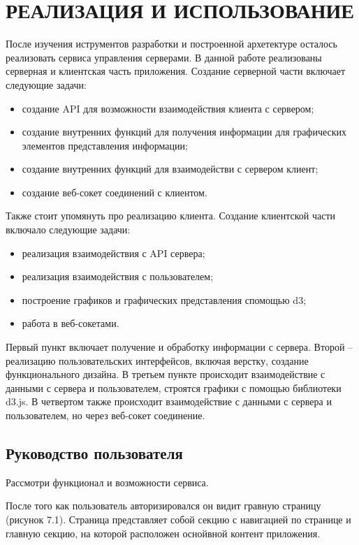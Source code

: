 \section{РЕАЛИЗАЦИЯ И ИСПОЛЬЗОВАНИЕ}
\label{sec:manual}

После изучения иструментов разработки и построенной архетектуре осталось реализовать сервиса управления серверами.
В данной работе реализованы серверная и клиентская часть приложения. Создание серверной части включает следующие
задачи:
\begin{itemize}
  \item создание API для возможности взаимодействия клиента с сервером;
  \item создание внутренних функций для получения информации для графических элементов представления информации;
  \item создание внутренних функций для взаимодействи с сервером клиент;
  \item создание веб-сокет соединений с клиентом.
\end{itemize}


Также стоит упомянуть про реализацию клиента. Создание клиентской части включало следующие задачи:
\begin{itemize}
\item реализация взаимодействия с API сервера;
\item реализация взаимодействия с пользователем;
\item построение графиков и графических представления спомощью d3;
\item работа в веб-сокетами.
\end{itemize}

Первый пункт включает получение и обработку информации с сервера. Второй – реализацию пользовательских интерфейсов, включая верстку, создание функционального дизайна. В третьем пункте происходит взаимодействие с
данными с сервера и пользователем, строятся графики с помощью библиотеки d3.js. В четвертом также происходит взаимодействие с данными с сервера и пользователем, но через веб-сокет соединение.

\subsection{Руководство пользователя}

Рассмотри функционал и возможности сервиса.

После того как пользователь авторизировался он видит гравную страницу (рисунок 7.1). Страница представляет собой секцию с навигацией по странице и главную секцию, на которой расположен оснойвной контент приложения.

